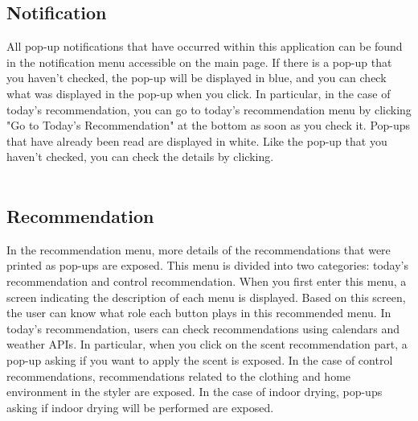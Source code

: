\documentclass[conference]{IEEEtran}
\begin{document}
\subsection{Notification}
All pop-up notifications that have occurred within this application can be found in the notification menu accessible on the main page. If there is a pop-up that you haven't checked, the pop-up will be displayed in blue, and you can check what was displayed in the pop-up when you click. In particular, in the case of today's recommendation, you can go to today's recommendation menu by clicking "Go to Today's Recommendation" at the bottom as soon as you check it. Pop-ups that have already been read are displayed in white. Like the pop-up that you haven't checked, you can check the details by clicking. \\ \\

\subsection{Recommendation}
In the recommendation menu, more details of the recommendations that were printed as pop-ups are exposed. This menu is divided into two categories: today's recommendation and control recommendation. When you first enter this menu, a screen indicating the description of each menu is displayed. Based on this screen, the user can know what role each button plays in this recommended menu. In today's recommendation, users can check recommendations using calendars and weather APIs. In particular, when you click on the scent recommendation part, a pop-up asking if you want to apply the scent is exposed. In the case of control recommendations, recommendations related to the clothing and home environment in the styler are exposed. In the case of indoor drying, pop-ups asking if indoor drying will be performed are exposed. \\ \\
\end{document}
